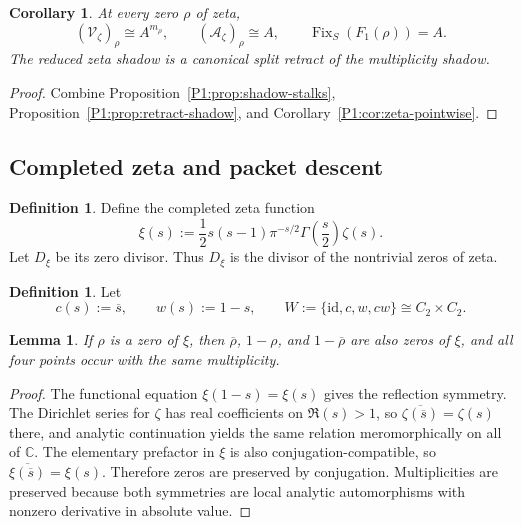 \documentclass[11pt,a4paper]{article}
\numberwithin{equation}{section}
\newtheorem{lemma}[theorem]{Lemma}
\newtheorem{corollary}[theorem]{Corollary}
\theoremstyle{definition}
\newtheorem{definition}[theorem]{Definition}
\theoremstyle{remark}
\DeclareMathOperator{\Fix}{Fix}
\newcommand{\CC}{\mathbb C}
\newcommand{\cV}{\mathcal V}
\newcommand{\cA}{\mathcal A}
\begin{document}
\begin{corollary}\label{P1:cor:zeta-shadow-sheaves}
At every zero $\rho$ of zeta,
\[
(\cV_\zeta)_\rho\cong A^{m_\rho},
\qquad
(\cA_\zeta)_\rho\cong A,
\qquad
\Fix_S(F_1(\rho))=A.
\]
The reduced zeta shadow is a canonical split retract of the multiplicity shadow.
\end{corollary}

\begin{proof}
Combine Proposition~\ref{P1:prop:shadow-stalks}, Proposition~\ref{P1:prop:retract-shadow}, and Corollary~\ref{P1:cor:zeta-pointwise}.
\end{proof}

\subsection{Completed zeta and packet descent}

\begin{definition}
Define the completed zeta function
\[
\xi(s):=\frac12 s(s-1)\pi^{-s/2}\Gamma\!\left(\frac s2\right)\zeta(s).
\]
Let $D_\xi$ be its zero divisor.  Thus $D_\xi$ is the divisor of the nontrivial zeros of zeta.
\end{definition}

\begin{definition}
Let
\[
c(s):=\overline s,
\qquad
w(s):=1-s,
\qquad
W:=\{\mathrm{id},c,w,cw\}\cong C_2\times C_2.
\]
\end{definition}

\begin{lemma}\label{P1:lem:xi-symmetry-multiplicity}
If $\rho$ is a zero of $\xi$, then $\overline\rho$, $1-\rho$, and $1-\overline\rho$ are also zeros of $\xi$, and all four points occur with the same multiplicity.
\end{lemma}

\begin{proof}
The functional equation $\xi(1-s)=\xi(s)$ gives the reflection symmetry.  The Dirichlet series for $\zeta$ has real coefficients on $\Re(s)>1$, so $\overline{\zeta(\overline s)}=\zeta(s)$ there, and analytic continuation yields the same relation meromorphically on all of $\CC$.  The elementary prefactor in $\xi$ is also conjugation-compatible, so $\overline{\xi(\overline s)}=\xi(s)$.  Therefore zeros are preserved by conjugation.  Multiplicities are preserved because both symmetries are local analytic automorphisms with nonzero derivative in absolute value.
\end{proof}
\end{document}
